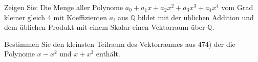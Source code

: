 \documentclass[a4paper, 12pt, margins=3cm]{homework}
\newcommand{\Q}{\mathbb{Q}}
\begin{document}
  \begin{problem}
    Zeigen Sie: Die Menge aller Polynome $a_0 + a_1x + a_2x^2 + a_3x^3 + a_4x^4$
    vom Grad kleiner gleich 4 mit Koeffizienten $a_i$ aus $\Q$ bildet mit der
    üblichen Addition und dem üblichen Produkt mit einem Skalar einen Vektorraum
    über $\Q$.
  \end{problem}
  \begin{solution}
    
  \end{solution}


  \begin{problem}
    Bestimmen Sie den kleinsten Teilraum des Vektorraumes aus 474) der die Polynome
    $x-x^2$ und $x+x^3$ enthält.
  \end{problem}
  \begin{solution}
    
  \end{solution}
\end{document}
